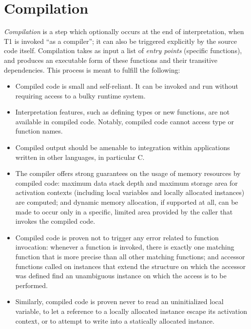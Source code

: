 \section{Compilation}

\emph{Compilation} is a step which optionally occurs at the end of
interpretation, when T1 is invoked ``as a compiler''; it can also be
triggered explicitly by the source code itself. Compilation takes as
input a list of \emph{entry points} (specific functions), and produces
an executable form of these functions and their transitive dependencies.
This process is meant to fulfill the following:
\begin{itemize}

    \item Compiled code is small and self-reliant. It can be invoked and
    run without requiring access to a bulky runtime system.

    \item Interpretation features, such as defining types or new
    functions, are not available in compiled code. Notably, compiled
    code cannot access type or function names.

    \item Compiled output should be amenable to integration within
    applications written in other languages, in particular C.

    \item The compiler offers strong guarantees on the usage of memory
    resources by compiled code: maximum data stack depth and maximum
    storage area for activation contexts (including local variables
    and locally allocated instances) are computed; and dynamic
    memory allocation, if supported at all, can be made to occur only
    in a specific, limited area provided by the caller that invokes
    the compiled code.

    \item Compiled code is proven not to trigger any error related
    to function invocation: whenever a function is invoked, there is
    exactly one matching function that is more precise than all other
    matching functions; and accessor functions called on instances that
    extend the structure on which the accessor was defined find an
    unambiguous instance on which the access is to be performed.

    \item Similarly, compiled code is proven never to read an
    uninitialized local variable, to let a reference to a locally
    allocated instance escape its activation context, or to attempt to
    write into a statically allocated instance.

\end{itemize}

